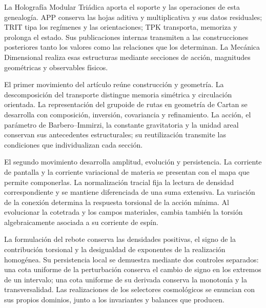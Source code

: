 La Holografía Modular Triádica aporta el soporte y las operaciones de esta
genealogía. APP conserva las hojas aditiva y multiplicativa y sus datos
residuales; TRIT tipa los regímenes y las orientaciones; TPK transporta,
memoriza y prolonga el estado. Sus publicaciones internas transmiten a
las construcciones posteriores tanto los valores como las relaciones que
los determinan. La Mecánica Dimensional realiza esas estructuras mediante
secciones de acción, magnitudes geométricas y observables físicos.

El primer movimiento del artículo reúne construcción y geometría. La
descomposición del transporte distingue memoria simétrica y circulación
orientada. La representación del grupoide de rutas en geometría de Cartan
se desarrolla con composición, inversión, covariancia y refinamiento. La
acción, el parámetro de Barbero--Immirzi, la constante gravitatoria y la
unidad areal conservan sus antecedentes estructurales; su reutilización
transmite las condiciones que individualizan cada sección.

El segundo movimiento desarrolla amplitud, evolución y persistencia.
La corriente de pantalla y la corriente variacional de materia se
presentan con el mapa que permite componerlas. La normalización tracial
fija la lectura de densidad correspondiente y se mantiene diferenciada de
una suma extensiva. La variación de la conexión determina la respuesta
torsional de la acción mínima. Al evolucionar la cotetrada y los campos
materiales, cambia también la torsión algebraicamente asociada a su
corriente de espín.

La formulación del rebote conserva las densidades positivas, el signo de
la contribución torsional y la desigualdad de exponentes de la realización
homogénea. Su persistencia local se demuestra mediante dos controles
separados: una cota uniforme de la perturbación conserva el cambio de
signo en los extremos de un intervalo; una cota uniforme de su derivada
conserva la monotonía y la transversalidad. Las realizaciones de los
selectores cosmológicos se enuncian con sus propios dominios, junto a los
invariantes y balances que producen.

